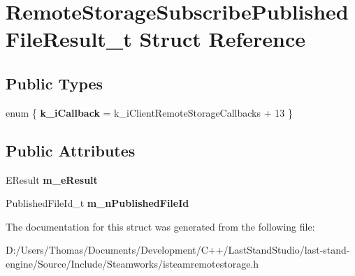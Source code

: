 \hypertarget{structRemoteStorageSubscribePublishedFileResult__t}{}\section{Remote\+Storage\+Subscribe\+Published\+File\+Result\+\_\+t Struct Reference}
\label{structRemoteStorageSubscribePublishedFileResult__t}
\subsection*{Public Types}
\begin{DoxyCompactItemize}
\item 
\hypertarget{structRemoteStorageSubscribePublishedFileResult__t_a25faca7f6385e53daa8f53af2994abe2}{}enum \{ {\bfseries k\+\_\+i\+Callback} = k\+\_\+i\+Client\+Remote\+Storage\+Callbacks + 13
 \}\label{structRemoteStorageSubscribePublishedFileResult__t_a25faca7f6385e53daa8f53af2994abe2}

\end{DoxyCompactItemize}
\subsection*{Public Attributes}
\begin{DoxyCompactItemize}
\item 
\hypertarget{structRemoteStorageSubscribePublishedFileResult__t_a46666f9551a3df415f92412f5f7e2d31}{}E\+Result {\bfseries m\+\_\+e\+Result}\label{structRemoteStorageSubscribePublishedFileResult__t_a46666f9551a3df415f92412f5f7e2d31}

\item 
\hypertarget{structRemoteStorageSubscribePublishedFileResult__t_af07dccf1615ee75eeb0bb09493df0e1c}{}Published\+File\+Id\+\_\+t {\bfseries m\+\_\+n\+Published\+File\+Id}\label{structRemoteStorageSubscribePublishedFileResult__t_af07dccf1615ee75eeb0bb09493df0e1c}

\end{DoxyCompactItemize}


The documentation for this struct was generated from the following file\+:\begin{DoxyCompactItemize}
\item 
D\+:/\+Users/\+Thomas/\+Documents/\+Development/\+C++/\+Last\+Stand\+Studio/last-\/stand-\/engine/\+Source/\+Include/\+Steamworks/isteamremotestorage.\+h\end{DoxyCompactItemize}
